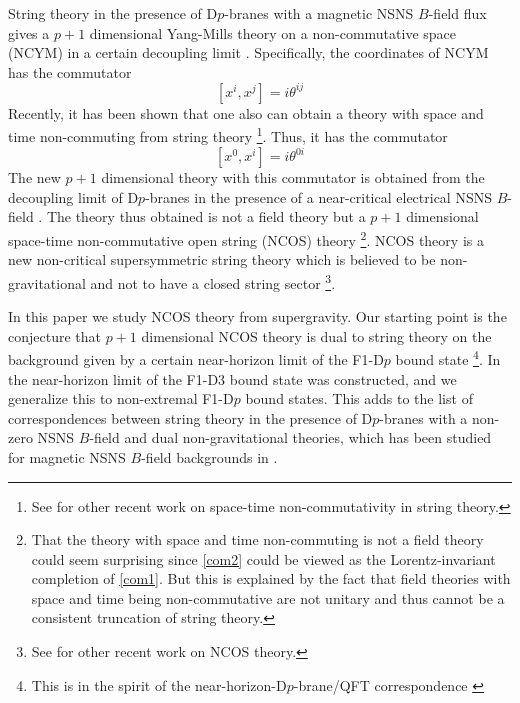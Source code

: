 \documentclass[a4paper,twoside,titlepage,12pt]{article}
\begin{document}
String theory in the presence of D$p$-branes 
with a magnetic NSNS $B$-field flux gives
a $p+1$ dimensional Yang-Mills theory 
on a non-commutative space (NCYM) in a 
certain decoupling limit \cite{Connes:1998cr,Seiberg:1999vs}.
Specifically, the coordinates of NCYM has the commutator
%
\begin{equation}
\label{com1}
[ x^i, x^j ] = i \theta^{ij} 
\end{equation}
%
Recently, it has been shown that one also can obtain a theory
with space and time non-commuting from string theory 
\cite{Seiberg:2000ms,Gopakumar:2000na}%
\footnote{See \cite{Seiberg:2000gc,Barbon:2000sg}
for other recent work on space-time
non-commutativity in string theory.}.
Thus, it has the commutator
%
\begin{equation}
\label{com2}
[ x^0 , x^i ] = i \theta^{0i}
\end{equation}
%
The new $p+1$ dimensional theory with this commutator is obtained
from the decoupling limit of D$p$-branes in the presence of a near-critical 
electrical NSNS $B$-field \cite{Seiberg:2000ms,Gopakumar:2000na}.
The theory thus obtained is not a field theory but a $p+1$ dimensional 
space-time non-commutative open string (NCOS) theory 
\cite{Seiberg:2000ms,Gopakumar:2000na}%
\footnote{That the theory with space and time 
non-commuting is not a field theory
could seem surprising since \eqref{com2} could be viewed
as the Lorentz-invariant completion of \eqref{com1}. 
But this is explained by the fact that 
field theories with space and time being non-commutative
are not unitary and thus cannot be a 
consistent truncation of string theory\cite{Gomis:2000zz}.}. 
NCOS theory is a new non-critical supersymmetric string 
theory which is believed to be non-gravitational and not to have 
a closed string sector \cite{Seiberg:2000ms,Gopakumar:2000na}%
\footnote{See \cite{Chen:2000ny} for other recent work on NCOS theory.}.

In this paper we study NCOS theory from supergravity.
Our starting point is the conjecture 
that $p+1$ dimensional NCOS theory is dual to 
string theory on the background given by 
a certain near-horizon limit of the F1-D$p$ 
bound state \cite{Gopakumar:2000na}%
\footnote{This is in the spirit of the near-horizon-D$p$-brane/QFT
correspondence \cite{Maldacena:1997re,Itzhaki:1998dd,Aharony:1999ti}}.
In \cite{Gopakumar:2000na} the near-horizon limit of the
F1-D3 bound state was constructed, and we generalize 
this to non-extremal F1-D$p$ bound states.
This adds to the list of correspondences
between string theory in the presence of D$p$-branes with a non-zero
NSNS $B$-field and dual non-gravitational theories, which has been
studied for magnetic NSNS $B$-field backgrounds in 
\cite{Maldacena:1999mh,Hashimoto:1999ut,Li:1999am,Alishahiha:1999ci,Harmark:1999rb,Lu:1999rm,Cai:2000hn}.
\end{document}
